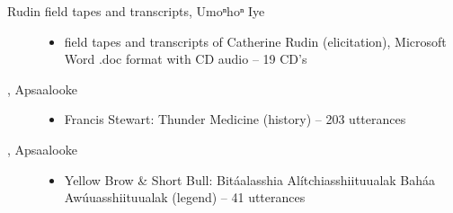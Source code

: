 \documentclass[output=paper]{LSP/langsci}
\begin{document}
\begin{description}
\item[Rudin field tapes and transcripts, Umoⁿhoⁿ Iye]\hfill
\begin{itemize}
\item field tapes and transcripts of Catherine Rudin (elicitation), Microsoft Word .doc format with CD audio -- 19 CD’s
\end{itemize}

\item[\citet{Wallace1993}, Apsaalooke]\hfill
\begin{itemize}
\item Francis Stewart: Thunder Medicine (history) -- 203 utterances
\end{itemize}

\item[\citet{YellowBrowShortBull1980}, Apsaalooke]\hfill
\begin{itemize}
\item Yellow Brow \& Short Bull: Bitáalasshia Alítchiasshiituualak Baháa Awúuasshiituualak (legend) -- 41 utterances
\end{itemize}

\end{description}

\printbibliography[heading=subbibliography,notkeyword=this]
\end{document}
